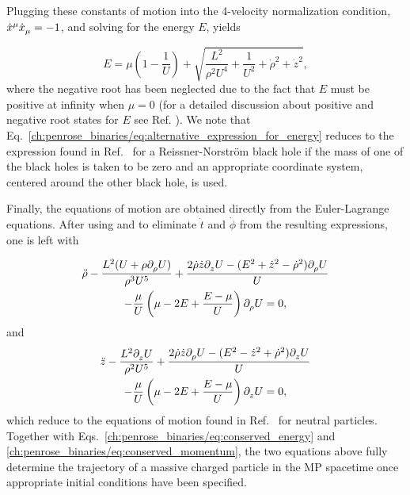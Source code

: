 Plugging these constants of motion into the 4-velocity normalization condition, $\tens{\dot{x}}{\mu}{}\tens{\dot{x}}{}{\mu} = -1$, and solving for the energy $E$, yields

\begin{equation}
    E = \mu\left(1-\frac{1}{U}\right) + \sqrt{\frac{L^2}{\rho^2U^4} + \frac{1}{U^2} + \dot{\rho}^2 + \dot{z}^2}
    \label{ch:penrose_binaries/eq:alternative_expression_for_energy},
\end{equation}
where the negative root has been neglected due to the fact that $E$ must be positive at infinity when $\mu = 0$ (for a detailed discussion about positive and negative root states for $E$ see Ref. \cite{RUFFINI1971}). We note that Eq.~\eqref{ch:penrose_binaries/eq:alternative_expression_for_energy} reduces to the expression found in Ref.~\cite{DENARDO1973} for a Reissner-Norstr{\"o}m black hole if the mass of one of the black holes is taken to be zero and an appropriate coordinate system, centered around the other black hole, is used.

Finally, the equations of motion are obtained directly from the Euler-Lagrange equations. After using  and  to eliminate $\dot{t}$ and $\dot{\phi}$ from the resulting expressions, one is left with

\begin{multline}
    \ddot{\rho}-\frac{L^2(U+\rho\indexdel{\rho}U)}{\rho^3 U^5} + \frac{2\dot{\rho}\dot{z}\indexdel{z}U - (E^2 + \dot{z}^2 - \dot{\rho}^2)\indexdel{\rho}U}{U} \\- \frac{\mu}{U}\left(\mu-2E+\frac{E-\mu}{U}\right)\indexdel{\rho}U = 0,
    \label{ch:penrose_binaries/eq:ode_for_rho_motion}
\end{multline}
%
and
\begin{multline}
    \ddot{z}-\frac{L^2\indexdel{z}U}{\rho^2 U^5} + \frac{2\dot{\rho}\dot{z}\indexdel{\rho}U - (E^2 - \dot{z}^2 + \dot{\rho}^2)\indexdel{z}U}{U} \\- \frac{\mu}{U}\left(\mu-2E+\frac{E-\mu}{U}\right)\indexdel{z}U = 0,
    \label{ch:penrose_binaries/eq:ode_for_z_motion}
\end{multline}
which reduce to the equations of motion found in Ref.~\cite{ASSUMPCAO2018} for neutral particles. Together with Eqs.~\eqref{ch:penrose_binaries/eq:conserved_energy} and \eqref{ch:penrose_binaries/eq:conserved_momentum}, the two equations above fully determine the trajectory of a massive charged particle in the MP spacetime once appropriate initial conditions have been specified.

